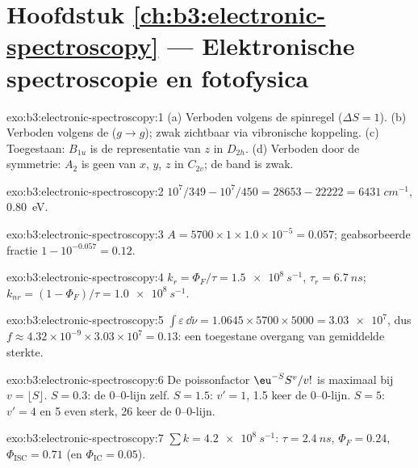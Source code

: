 \section*{Hoofdstuk \ref{ch:b3:electronic-spectroscopy} --- Elektronische spectroscopie en fotofysica}

\begin{solution}{exo:b3:electronic-spectroscopy:1}
(a) Verboden volgens de spinregel ($\Delta S = 1$). (b) Verboden volgens de
($g \to g$); zwak zichtbaar via vibronische koppeling. (c) Toegestaan: $B_{1u}$ is de
representatie van $z$ in $D_{2h}$. (d) Verboden door de symmetrie: $A_2$ is
geen van $x$,
$y$, $z$ in $C_{2v}$; de band is zwak.
\end{solution}

\begin{solution}{exo:b3:electronic-spectroscopy:2}
$10^7/349 - 10^7/450 = 28653 - 22222 = \qty{6431}{cm^{-1}}$, \qty{0.80}{eV}.
\end{solution}

\begin{solution}{exo:b3:electronic-spectroscopy:3}
$A = 5700 \times 1 \times 1.0\times10^{-5} = 0.057$; geabsorbeerde fractie $1 - 10^{-0.057} =
0.12$.
\end{solution}

\begin{solution}{exo:b3:electronic-spectroscopy:4}
$k_r = \Phi_F/\tau = \qty{1.5e8}{s^{-1}}$, $\tau_r = \qty{6.7}{ns}$; $k_{nr} = (1 - \Phi_F)/\tau
= \qty{1.0e8}{s^{-1}}$.
\end{solution}

\begin{solution}{exo:b3:electronic-spectroscopy:5}
$\int\varepsilon\,\dd\tilde\nu = 1.0645 \times 5700 \times 5000 = \num{3.03e7}$, dus $f \approx
4.32\times10^{-9} \times 3.03\times10^7 = 0.13$: een toegestane overgang van
gemiddelde sterkte.
\end{solution}

\begin{solution}{exo:b3:electronic-spectroscopy:6}
De poissonfactor $\eu^{-S}S^v/v!$ is maximaal bij $v = \lfloor S\rfloor$. $S = 0.3$: de
0--0-lijn zelf. $S = 1.5$: $v' = 1$, 1.5 keer de 0--0-lijn. $S = 5$: $v' = 4$
en 5 even sterk, 26 keer de 0--0-lijn.
\end{solution}

\begin{solution}{exo:b3:electronic-spectroscopy:7}
$\sum k = \qty{4.2e8}{s^{-1}}$: $\tau = \qty{2.4}{ns}$, $\Phi_F = 0.24$, $\Phi_{\mathrm{ISC}} = 0.71$
(en $\Phi_{\mathrm{IC}} = 0.05$).
\end{solution}

